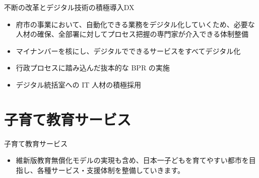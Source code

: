\documentclass[dvipdfmx]{beamer}
\begin{document}
    \begin{frame}{不断の改革とデジタル技術の積極導入}{DX}
        \begin{small}
            \begin{itemize}
                \setlength{\itemsep}{2mm}
                \item 府市の事業において、自動化できる業務をデジタル化していくため、必要な人材の確保、全部署に対してプロセス把握の専門家が介入できる体制整備
                \item マイナンバーを核にし、デジタルでできるサービスをすべてデジタル化
                \item 行政プロセスに踏み込んだ抜本的な BPR の実施
                \item デジタル統括室への IT 人材の積極採用
                \hspace{.2mm}
            \end{itemize}
        \end{small}
    \end{frame}

\section{子育て教育サービス}
    \begin{frame}
        \sectionpage
    \end{frame}

    \begin{frame}{子育て教育サービス}{}
        \begin{small}
            \begin{itemize}
                \setlength{\itemsep}{2mm}
                \item 維新版教育無償化モデルの実現も含め、日本一子どもを育てやすい都市を目指し、各種サービス・支援体制を整備していきます。                
            \end{itemize}
        \end{small}
    \end{frame}
\end{document}
